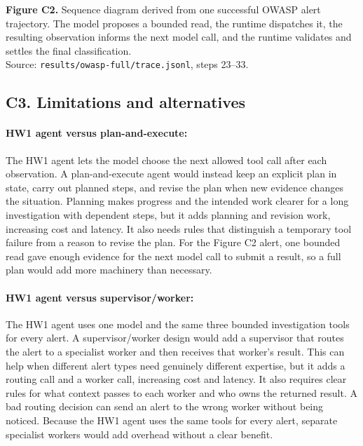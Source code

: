 \documentclass[11pt]{article}
\begin{document}
\begin{center}
{%
}
\end{center}
\noindent\textbf{Figure C2.} Sequence diagram derived from one successful OWASP alert trajectory. The model proposes a bounded read, the runtime dispatches it, the resulting observation informs the next model call, and the runtime validates and settles the final classification.\\ Source: \texttt{results/owasp-full/trace.jsonl}, steps 23--33.

\clearpage
\subsection*{C3. Limitations and alternatives}

\paragraph{HW1 agent versus plan-and-execute:}
The HW1 agent lets the model choose the next allowed tool call after each observation. A plan-and-execute agent would instead keep an explicit plan in state, carry out planned steps, and revise the plan when new evidence changes the situation. Planning makes progress and the intended work clearer for a long investigation with dependent steps, but it adds planning and revision work, increasing cost and latency. It also needs rules that distinguish a temporary tool failure from a reason to revise the plan. For the Figure C2 alert, one bounded read gave enough evidence for the next model call to submit a result, so a full plan would add more machinery than necessary.

\paragraph{HW1 agent versus supervisor/worker:}
The HW1 agent uses one model and the same three bounded investigation tools for every alert. A supervisor/worker design would add a supervisor that routes the alert to a specialist worker and then receives that worker's result. This can help when different alert types need genuinely different expertise, but it adds a routing call and a worker call, increasing cost and latency. It also requires clear rules for what context passes to each worker and who owns the returned result. A bad routing decision can send an alert to the wrong worker without being noticed. Because the HW1 agent uses the same tools for every alert, separate specialist workers would add overhead without a clear benefit.
\end{document}
